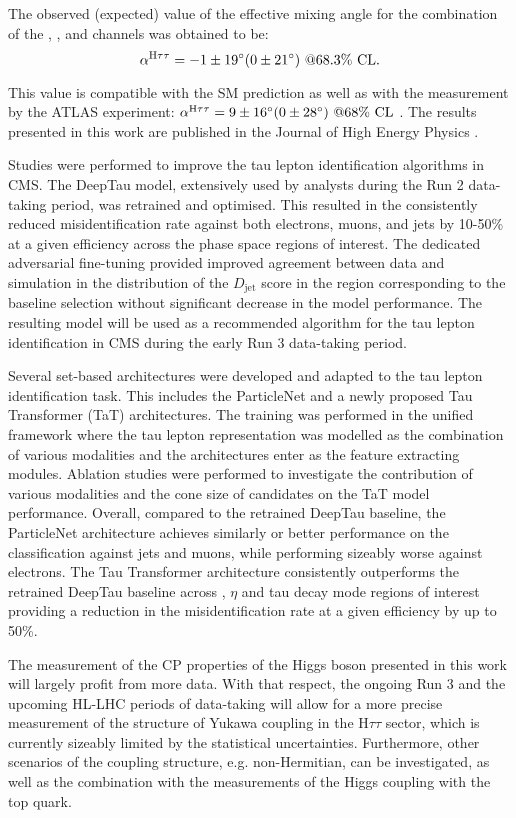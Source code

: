 The observed (expected) value of the effective mixing angle for the combination of the \et, \mt, and \tata channels was obtained to be:
\begin{equation}
    \alpha^{\text{H}\tau\tau} = -1 \pm 19^\circ (0 \pm 21^\circ) ~@68.3\% \text{ CL}.
\end{equation}

This value is compatible with the SM prediction as well as with the measurement by the ATLAS experiment: $\alpha^{\text{H}\tau\tau} = 9 \pm 16^\circ (0 \pm 28^\circ) ~@68\% \text{ CL}$ \cite{ATLAS:2022phj}. The results presented in this work are published in the Journal of High Energy Physics \cite{CMS:2021sdq}.

Studies were performed to improve the tau lepton identification algorithms in CMS. The DeepTau model, extensively used by analysts during the Run 2 data-taking period, was retrained and optimised. This resulted in the consistently reduced misidentification rate against both electrons, muons, and jets by 10-50\% at a given efficiency across the phase space regions of interest. The dedicated adversarial fine-tuning provided improved agreement between data and simulation in the distribution of the $D_\text{jet}$ score in the region corresponding to the baseline \htt selection without significant decrease in the model performance. The resulting model will be used as a recommended algorithm for the tau lepton identification in CMS during the early Run 3 data-taking period. 

Several set-based architectures were developed and adapted to the tau lepton identification task. This includes the ParticleNet and a newly proposed Tau Transformer (TaT) architectures. The training was performed in the unified framework where the tau lepton representation was modelled as the combination of various modalities and the architectures enter as the feature extracting modules. Ablation studies were performed to investigate the contribution of various modalities and the cone size of \tauh candidates on the TaT model performance. Overall, compared to the retrained DeepTau baseline, the ParticleNet architecture achieves similarly or better performance on the \tauh classification against jets and muons, while performing sizeably worse against electrons. The Tau Transformer architecture consistently outperforms the retrained DeepTau baseline across \pt, $\eta$ and tau decay mode regions of interest providing a reduction in the misidentification rate at a given \tauh efficiency by up to 50\%. 

The measurement of the CP properties of the Higgs boson presented in this work will largely profit from more data. With that respect, the ongoing Run 3 and the upcoming HL-LHC periods of data-taking will allow for a more precise measurement of the structure of Yukawa coupling in the $\text{H}\tau\tau$ sector, which is currently sizeably limited by the statistical uncertainties. Furthermore, other scenarios of the coupling structure, e.g. non-Hermitian, can be investigated, as well as the combination with the measurements of the Higgs coupling with the top quark.  

